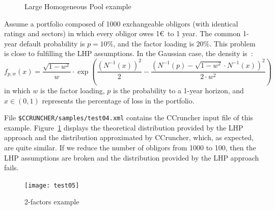 \documentclass[11pt,fleqn]{book} %
\begin{document}
\begin{figure}[!h]
	\centering
	\caption{Large Homogeneous Pool example}
	\label{fig:test04} 
\end{figure}

\begin{example}
	\label{ex:test04}
	Assume a portfolio composed of \num{1000} exchangeable obligors (with 
	identical ratings and sectors) in which every obligor owes 1\euro\ to 
	1 year. The common 1-year default probability is $p=10\%$, and the factor 
	loading is $20\%$. This problem is close to fulfilling the LHP assumptions. 
	In the Gaussian case, the density is~\cite[chap. 2.5]{bluhm:2002}: 
	\begin{displaymath}
		f_{p,w}(x) = 
		\frac{\sqrt{1-w^2}}{w} \cdot \exp\left( 
			\frac{\left(N^{-1}(x)\right)^2}{2} -
			\frac{\left(N^{-1}(p) - \sqrt{1-w^2} \cdot N^{-1}(x)\right)^2}{2 \cdot w^2}
		\right)
	\end{displaymath}
	in which $w$ is the factor loading, $p$ is the probability to a 1-year 
	horizon, and $x \in (0,1)$ represents the percentage of loss in the 
	portfolio. 

	File \texttt{\$CCRUNCHER/samples/test04.xml} contains the CCruncher input
	file of this example. Figure~\ref{fig:test04} displays the theoretical
	distribution provided by the LHP approach and the distribution approximated 
	by CCruncher, which, as expected, are quite similar. If we reduce the number 
	of obligors from \num{1000} to \num{100}, then the LHP assumptions are 
	broken and the distribution provided by the LHP approach fails.
\end{example}

\begin{figure}[!h]
	\centering
	\texttt{[image: test05]}
	\caption{2-factors example}
	\label{fig:test05}
\end{figure}
\end{document}

